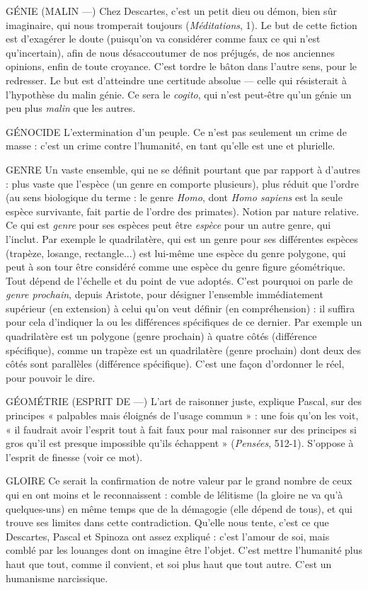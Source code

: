 GÉNIE (MALIN —) Chez Descartes, c’est un petit dieu ou démon, bien sûr
imaginaire, qui nous tromperait toujours ({\it Méditations}, 1).
Le but de cette fiction est d’exagérer le doute (puisqu’on va considérer comme
faux ce qui n’est qu’incertain), afin de nous désaccoutumer de nos préjugés, de
nos anciennes opinions, enfin de toute croyance. C’est tordre le bâton dans
l’autre sens, pour le redresser. Le but est d’atteindre une certitude absolue —
celle qui résisterait à l'hypothèse du malin génie. Ce sera le {\it cogito}, qui n’est
peut-être qu’un génie un peu plus {\it malin} que les autres.

GÉNOCIDE  L’extermination d’un peuple. Ce n’est pas seulement un crime
de masse : c’est un crime contre l'humanité, en tant qu’elle est
une et plurielle.

GENRE Un vaste ensemble, qui ne se définit pourtant que par rapport à
d’autres : plus vaste que l’espèce (un genre en comporte plusieurs),
plus réduit que l’ordre (au sens biologique du terme : le genre {\it Homo}, dont
{\it Homo sapiens} est la seule espèce survivante, fait partie de l’ordre des primates).
Notion par nature relative. Ce qui est {\it genre} pour ses espèces peut être
{\it espèce} pour un autre genre, qui l’inclut. Par exemple le quadrilatère, qui est
un genre pour ses différentes espèces (trapèze, losange, rectangle...) est lui-même
une espèce du genre polygone, qui peut à son tour être considéré
comme une espèce du genre figure géométrique. Tout dépend de l'échelle et
du point de vue adoptés. C’est pourquoi on parle de {\it genre prochain}, depuis
Aristote, pour désigner l’ensemble immédiatement supérieur (en extension) à
celui qu’on veut définir (en compréhension) : il suffira pour cela d’indiquer
la ou les différences spécifiques de ce dernier. Par exemple un quadrilatère est
un polygone (genre prochain) à quatre côtés (différence spécifique), comme
un trapèze est un quadrilatère (genre prochain) dont deux des côtés sont
parallèles (différence spécifique). C’est une façon d’ordonner le réel, pour
pouvoir le dire.

GÉOMÉTRIE (ESPRIT DE —)  L’art de raisonner juste, explique Pascal, sur
des principes « palpables mais éloignés de
l'usage commun » : une fois qu’on les voit, « il faudrait avoir l'esprit tout à fait
faux pour mal raisonner sur des principes si gros qu’il est presque impossible
qu’ils échappent » ({\it Pensées}, 512-1). S’oppose à l'esprit de finesse (voir ce mot).

GLOIRE Ce serait la confirmation de notre valeur par le grand nombre de
ceux qui en ont moins et le reconnaissent : comble de lélitisme (la
gloire ne va qu’à quelques-uns) en même temps que de la démagogie (elle
dépend de tous), et qui trouve ses limites dans cette contradiction. Qu'elle
nous tente, c’est ce que Descartes, Pascal et Spinoza ont assez expliqué : c’est
l'amour de soi, mais comblé par les louanges dont on imagine être l’objet. C’est
mettre l'humanité plus haut que tout, comme il convient, et soi plus haut que
tout autre. C’est un humanisme narcissique.

